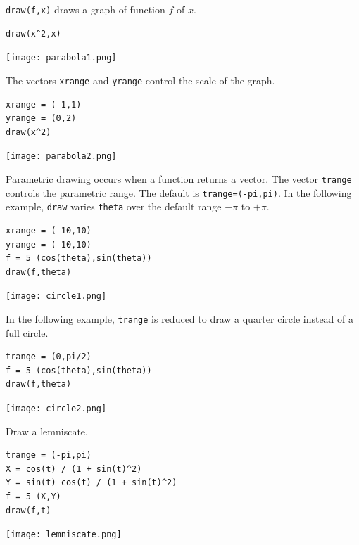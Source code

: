 \documentclass[12pt]{article}
\begin{document}
\verb$draw(f,x)$ draws a graph of function $f$ of $x$.

{\color{blue}
\begin{verbatim}
draw(x^2,x)
\end{verbatim}}

\begin{center}
\texttt{[image: parabola1.png]}
\end{center}

The vectors \verb$xrange$ and \verb$yrange$ control the scale of the graph.

{\color{blue}
\begin{verbatim}
xrange = (-1,1)
yrange = (0,2)
draw(x^2)
\end{verbatim}}

\begin{center}
\texttt{[image: parabola2.png]}
\end{center}

Parametric drawing occurs when a function returns a vector.
The vector \verb$trange$ controls the parametric range.
The default is \verb$trange=(-pi,pi)$.
In the following example, \verb$draw$ varies \verb$theta$
over the default range $-\pi$ to $+\pi$.

{\color{blue}
\begin{verbatim}
xrange = (-10,10)
yrange = (-10,10)
f = 5 (cos(theta),sin(theta))
draw(f,theta)
\end{verbatim}}

\begin{center}
\texttt{[image: circle1.png]}
\end{center}

In the following example, \verb$trange$ is reduced
to draw a quarter circle instead of a full circle.

{\color{blue}
\begin{verbatim}
trange = (0,pi/2)
f = 5 (cos(theta),sin(theta))
draw(f,theta)
\end{verbatim}}

\begin{center}
\texttt{[image: circle2.png]}
\end{center}

Draw a lemniscate.

{\color{blue}
\begin{verbatim}
trange = (-pi,pi)
X = cos(t) / (1 + sin(t)^2)
Y = sin(t) cos(t) / (1 + sin(t)^2)
f = 5 (X,Y)
draw(f,t)
\end{verbatim}}

\begin{center}
\texttt{[image: lemniscate.png]}
\end{center}
\end{document}
